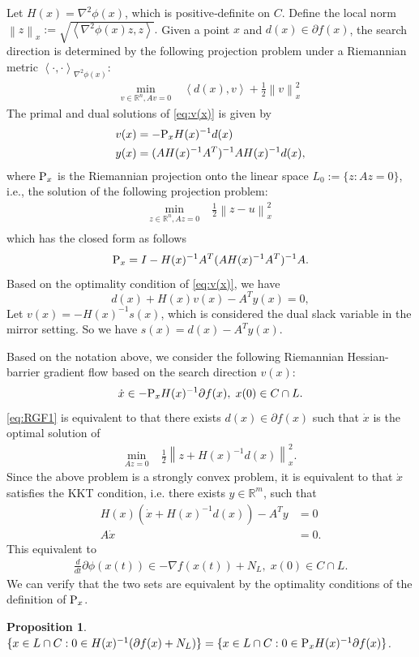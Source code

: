 \documentclass[11pt]{article}
\newcommand{\R}{\mathbb R}
\def\norm#1{\left\|#1\right\|}
\def\inner#1{\left\langle#1\right\rangle}
\newtheorem{proposition}{Proposition}[section]
\begin{document}
Let $H(x)=\nabla^2\phi(x)$, which is positive‐definite on \(C\). Define the local norm $\norm{z}_x:=\sqrt{\inner{\nabla^2\phi(x)z,z}}.$ Given a point $x$ and $d(x)\in\partial f(x)$, the search direction is determined by the following projection problem under a Riemannian metric $\inner{\cdot,\cdot}_{\nabla^2\phi(x)}$:
\begin{equation}
\label{eq:v(x)}
\begin{aligned}
\min_{v\in\R^n,Av=0}\;&\inner{d(x),v}+\frac{1}{2}\norm{v}_x^2
\end{aligned}
\end{equation}
The primal and dual solutions of \eqref{eq:v(x)} is given by 
\[
\begin{aligned}
v(x)&=-{\rm P}_xH(x)^{-1}d(x)\\
y(x)&=(AH(x)^{-1}A^T)^{-1}AH(x)^{-1}d(x),
\end{aligned}
\]
where ${\rm P}_x$ is the Riemannian projection onto the linear space $L_0:=\{z:Az=0\}$, i.e., the solution of the following projection problem:
\[
\begin{aligned}
\min_{z\in\R^n,Az=0}\;&\frac{1}{2}\norm{z-u}_x^2\\
\end{aligned}
\]
which has the closed form as follows 
\[
{\rm P}_x=I-H(x)^{-1}A^T(AH(x)^{-1}A^T)^{-1}A.
\]
Based on the optimality condition of \eqref{eq:v(x)}, we have
\[
d(x)+H(x)v(x)-A^Ty(x)=0,
\]
Let $v(x)=-H(x)^{-1}s(x)$, which is considered the dual slack variable in the mirror setting. So we have $s(x)=d(x)-A^Ty(x)$. 

Based on the notation above, we consider the following Riemannian Hessian-barrier gradient flow based on the search direction $v(x)$:
\begin{equation}
\label{eq:RGF1}
\dot x\in -{\rm P}_xH(x)^{-1}\partial f(x),\;x(0)\in C\cap L.
\end{equation}
\eqref{eq:RGF1} is equivalent to that there exists $d(x)\in\partial f(x)$ such that $\dot x$ is the optimal solution of  
\[
\begin{aligned}
\min_{Az=0}\;&\frac{1}{2}\norm{z+H(x)^{-1}d(x)}_x^2.
\end{aligned}
\]
Since the above problem is a strongly convex problem, it is equivalent to that $\dot x$ satisfies the KKT condition, i.e. there exists $y\in\R^m$, such that 
\[
\begin{aligned}
H(x)\left(\dot x+H(x)^{-1}d(x)\right)-A^Ty&=0\\
A\dot x&=0.
\end{aligned}
\]
This equivalent to 
\begin{equation}
\begin{aligned}
\frac{d}{dt}\partial\phi(x(t))\in-\nabla f(x(t))+N_{L},\;x(0)\in C\cap L.  
\end{aligned}
\label{eq:RGF2}
\tag{RGF2}
\end{equation}
We can verify that the two sets are equivalent by the optimality conditions of the definition of ${\rm P}_x$.
\begin{proposition}
\label{prop:equiv_stable}
$\{x\in L\cap C:0\in H(x)^{-1}(\partial f(x)+N_L)\}=\{x\in L\cap C:0\in {\rm P}_xH(x)^{-1}\partial f(x)\}$.
\end{proposition}
\end{document}
